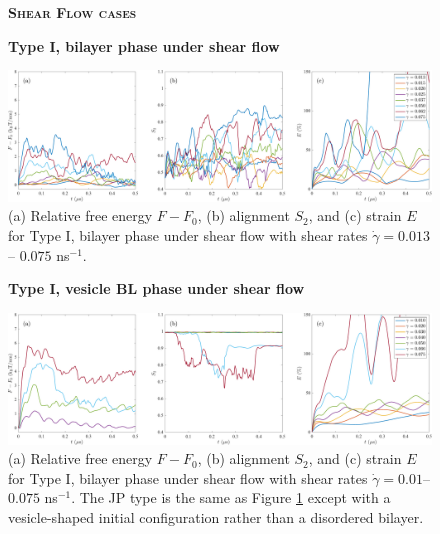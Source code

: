 \begin{figure}[h!]
\begin{center}
\textbf{\textsc{Shear Flow cases}}\par\medskip
\textbf{Type I, bilayer phase under shear flow}\par\medskip
\includegraphics[width=\textwidth]{SMFigures/ULShRaw.pdf}
\end{center}
\caption{(a) Relative free energy $F - F_0$, (b) alignment $S_2$, and
  (c) strain $E$ for Type I, bilayer phase under shear flow with shear
  rates $\dot\gamma=0.013$ -- $0.075$ ns$^{-1}$.
}
\label{fig:ulshraw}
\end{figure}


\begin{figure}[h!]
\begin{center}
\textbf{Type I, vesicle BL phase under shear flow}\par\medskip
\includegraphics[width=\textwidth]{SMFigures/VeShRaw.pdf}
\end{center}
\caption{(a) Relative free energy $F - F_0$, (b) alignment $S_2$, and
  (c) strain $E$ for Type I, bilayer phase under shear flow with shear
  rates $\dot\gamma=0.01$--$0.075$ ns$^{-1}$.  The JP type is the same
  as Figure \ref{fig:ulshraw} except with a vesicle-shaped initial
  configuration rather than a
  disordered bilayer.  
}
\label{fig:veshraw}
\end{figure}


